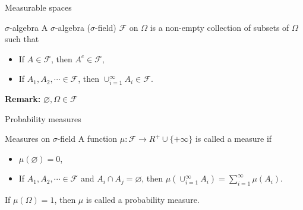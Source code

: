 \documentclass [aspectratio=169]{beamer}
\newcommand{\mc}{\mathcal}
\begin{document}
\begin{frame}{Measurable spaces}
    \begin{block}{$\sigma$-algebra}
  A $\sigma$-algebra ($\sigma$-field) $\mc{F}$ on $\Omega$ is a non-empty collection of subsets of $\Omega$ such that
    \begin{itemize}
        \item If $A \in \mc{F}$, then $A^c \in \mc{F}$, %
        \item If $A_1, A_2, \cdots \in \mc{F}$, then $\cup_{i = 1}^\infty A_i \in \mc{F}$. %
    \end{itemize}
    \end{block}
    \textbf{Remark:} $\varnothing, \Omega \in \mc{F}$
    \vspace{1.5in}
\end{frame}

\begin{frame}{Probability measures}
    \begin{block}{Measures on $\sigma$-field}
    A function $\mu: \mc{F} \to R^{+}\cup \{+\infty\}$ is called a measure if
    \begin{itemize}
        \item $\mu(\varnothing) = 0$,
        \item If $A_1, A_2, \cdots \in \mc{F}$ and $A_i \cap A_j = \varnothing$, then $\mu(\cup_{i = 1}^\infty A_i) = \sum_{i = 1}^\infty \mu(A_i)$.
    \end{itemize}
    If $\mu(\Omega) = 1$, then $\mu$ is called a probability measure. 
    \end{block}
    \vspace{0.1in}
\end{frame}
\end{document}
